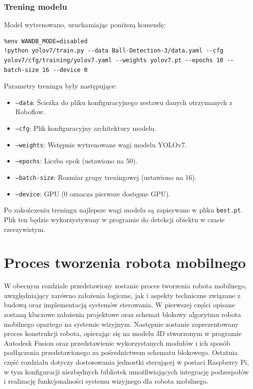 \documentclass[a4paper,twoside,12pt]{book}
\begin{document}
\subsection{Trening modelu}
Model wytrenowano, uruchamiając poniższą komendę:
\begin{verbatim}
%env WANDB_MODE=disabled
!python yolov7/train.py --data Ball-Detection-3/data.yaml --cfg yolov7/cfg/training/yolov7.yaml --weights yolov7.pt --epochs 10 --batch-size 16 --device 0
\end{verbatim}
Parametry treningu były następujące:
\begin{itemize}
    \item \texttt{--data}: Ścieżka do pliku konfiguracyjnego zestawu danych otrzymanych z Roboflow.
    \item \texttt{--cfg}: Plik konfiguracyjny architektury modelu.
    \item \texttt{--weights}: Wstępnie wytrenowane wagi modelu YOLOv7.
    \item \texttt{--epochs}: Liczba epok (ustawiono na 50).
    \item \texttt{--batch-size}: Rozmiar grupy treningowej (ustawiono na 16).
    \item \texttt{--device}: GPU (0 oznacza pierwsze dostępne GPU).
\end{itemize}
Po zakończeniu treningu najlepsze wagi modelu są zapisywane w pliku \texttt{best.pt}. Plik ten będzie wykorzystywany w programie do detekcji obiektu w czasie rzeczywistym.

\chapter{Proces tworzenia robota mobilnego}
\label{ch:04}
W obecnym rozdziale przedstawiony zostanie proces tworzenia robota mobilnego, uwzględniający zarówno założenia logiczne, jak i aspekty techniczne związane z budową oraz implementacją systemów sterowania. W pierwszej części opisane zostaną kluczowe założenia projektowe oraz schemat blokowy algorytmu robota mobilnego opartego na systemie wizyjnym. Następnie zostanie zaprezentowany proces konstrukcji robota, opierając się na modelu 3D stworzonym w programie Autodesk Fusion oraz przedstawienie wykorzystanych modułów i ich sposób podłączenia przedstawionego za pośrednictwem schematu blokowego. Ostatnia część rozdziału dotyczy dostosowania jednostki sterującej w postaci Raspberry Pi, w tym konfiguracji niezbędnych bibliotek umożliwiających integrację podzespołów i realizację funkcjonalności systemu wizyjnego dla robota mobilnego.
\end{document}
